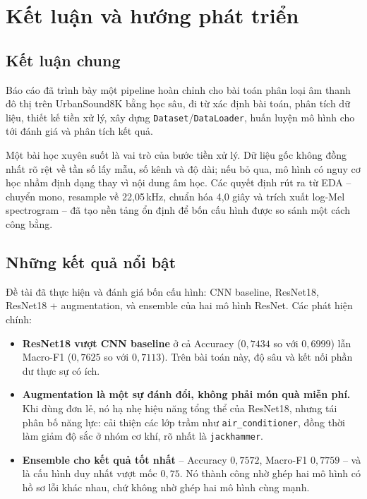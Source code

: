 \section{Kết luận và hướng phát triển}
\label{sec:conclusion}

\subsection{Kết luận chung}

Báo cáo đã trình bày một pipeline hoàn chỉnh cho bài toán phân loại âm thanh đô
thị trên UrbanSound8K bằng học sâu, đi từ xác định bài toán, phân tích dữ liệu,
thiết kế tiền xử lý, xây dựng \texttt{Dataset}/\texttt{DataLoader}, huấn luyện mô
hình cho tới đánh giá và phân tích kết quả.

Một bài học xuyên suốt là vai trò của bước tiền xử lý. Dữ liệu gốc không đồng
nhất rõ rệt về tần số lấy mẫu, số kênh và độ dài; nếu bỏ qua, mô hình có nguy cơ
học nhầm định dạng thay vì nội dung âm học. Các quyết định rút ra từ EDA -- chuyển
mono, resample về 22{,}05\,kHz, chuẩn hóa 4{,}0 giây và trích xuất log-Mel
spectrogram -- đã tạo nền tảng ổn định để bốn cấu hình được so sánh một cách công
bằng.

\subsection{Những kết quả nổi bật}

Đề tài đã thực hiện và đánh giá bốn cấu hình: CNN baseline, ResNet18, ResNet18 +
augmentation, và ensemble của hai mô hình ResNet. Các phát hiện chính:

\begin{itemize}[leftmargin=1.4em,itemsep=2pt]
  \item \textbf{ResNet18 vượt CNN baseline} ở cả Accuracy ($0{,}7434$ so với
        $0{,}6999$) lẫn Macro-F1 ($0{,}7625$ so với $0{,}7113$). Trên bài toán
        này, độ sâu và kết nối phần dư thực sự có ích.
  \item \textbf{Augmentation là một sự đánh đổi, không phải món quà miễn phí.}
        Khi dùng đơn lẻ, nó hạ nhẹ hiệu năng tổng thể của ResNet18, nhưng tái
        phân bố năng lực: cải thiện các lớp trầm như \texttt{air\_conditioner},
        đồng thời làm giảm độ sắc ở nhóm cơ khí, rõ nhất là \texttt{jackhammer}.
  \item \textbf{Ensemble cho kết quả tốt nhất} -- Accuracy $0{,}7572$, Macro-F1
        $0{,}7759$ -- và là cấu hình duy nhất vượt mốc $0{,}75$. Nó thành công
        nhờ ghép hai mô hình có hồ sơ lỗi khác nhau, chứ không nhờ ghép hai mô
        hình cùng mạnh.
\end{itemize}

